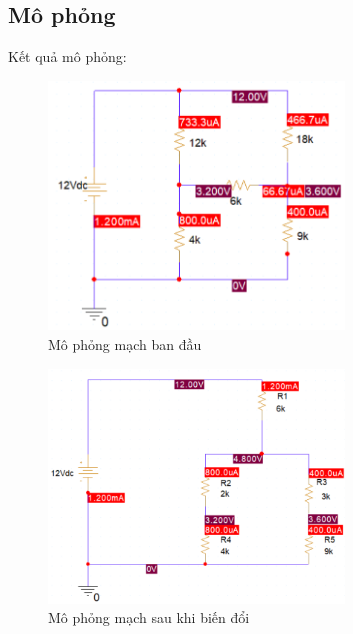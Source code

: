 \subsection{Mô phỏng}
Kết quả mô phỏng:
\begin{figure}[!htbp]
    \centering
    \includegraphics[width=0.7\textwidth]{graphics/ex7/f3.png}
    \caption{Mô phỏng mạch ban đầu}
\end{figure}
\begin{figure}[!htbp]
    \centering
    \includegraphics[width=0.7\textwidth]{graphics/ex7/f4.png}
    \caption{Mô phỏng mạch sau khi biến đổi}
\end{figure}